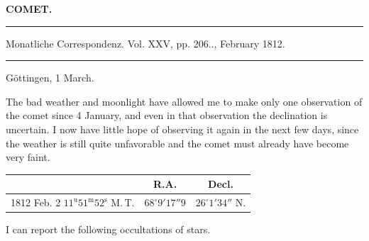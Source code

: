 \clearpage{}\hypertarget{native-352-lower}{}\label{native-352-lower}
\begin{center}\textbf{COMET.}\par\vspace{4pt}\hrule\vspace{4pt}\fontsize{10}{12}\selectfont Monatliche Correspondenz. Vol. XXV, pp. 206\;.., February 1812.\par\vspace{4pt}\hrule\vspace{4pt}\end{center}

\begin{flushright}Göttingen, 1 March.\end{flushright}
\par\indent The bad weather and moonlight have allowed me to make only one observation of the comet since 4 January, and even in that observation the declination is uncertain. I now have little hope of observing it again in the next few days, since the weather is still quite unfavorable and the comet must already have become very faint.

\begin{center}
\fontsize{10}{12}\selectfont\setlength{\tabcolsep}{4pt}\begin{tabular}{l|c|c}
 & R.A. & Decl. \\
\hline
1812 Feb. 2 \quad $11^{\mathrm{u}}51^{\mathrm{m}}52^{\mathrm{s}}$ M.\,T. & $68^\circ9'17''9$ & $26^\circ1'34''$ N. \\
\end{tabular}
\end{center}

\par\indent I can report the following occultations of stars.

